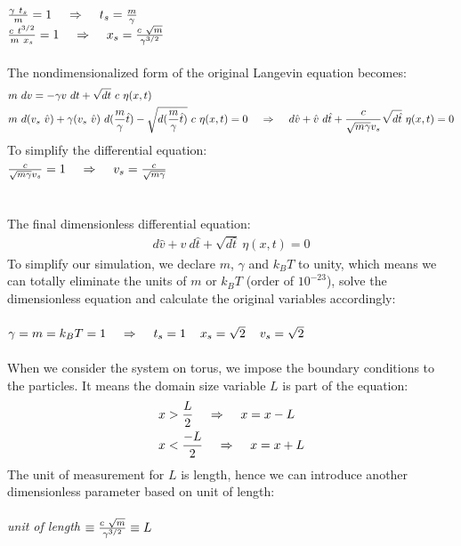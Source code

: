 \documentclass[a4paper,11pt]{article}
\newcommand\tab[1][4mm]{\hspace*{#1}}
\begin{document}
    \(\frac{\gamma\ t_s}{m} = 1 \tab \Rightarrow \tab t_s = \frac{m}{\gamma}\) \hspace{20mm}
    {} \\

    \(\frac{c\ t^{3/2}}{m\ x_s} = 1 \tab \Rightarrow \tab x_s=\frac{c\ \sqrt{m}}{\gamma^{3/2}}\) \hspace{12mm}
    {} \\\\
The nondimensionalized form of the original Langevin equation becomes:
\begin{align*}
    &m\ dv = -\gamma v\ dt + \sqrt{dt}\ c\ \eta(x,t) \\
    &m\ d(v_s\ \hat{v}) + \gamma (v_s\ \hat{v})\ d(\frac{m}{\gamma}\hat{t}) - \sqrt{d(\frac{m}{\gamma}\hat{t})}\ c\ \eta(x,t) = 0 \tab \Rightarrow \tab d\hat{v} + \hat{v}\ d\hat{t} + \frac{c}{\sqrt{m\gamma}v_s} \sqrt{d\hat{t}}\ \eta(x,t) = 0
\end{align*}
To simplify the differential equation: \\
    \(\frac{c}{\sqrt{m\gamma}v_s} = 1 \tab \Rightarrow \tab v_s = \frac{c}{\sqrt{m\gamma}}\) \hspace{15mm}
    {} \\\\
\\The final dimensionless differential equation:
\begin{align*}
    d\hat{v} + \hat{v}\ d\hat{t} + \sqrt{d\hat{t}}\ \eta(x,t) = 0
\end{align*}
To simplify our simulation, we declare \(m\), \(\gamma\) and \(k_BT\) to unity, which means we can totally eliminate the units of \(m\) or \(k_BT\) (order of \(10^{-23}\)), solve the dimensionless equation and calculate the original variables accordingly:\\\\
\(\gamma = m = k_BT = 1 \tab \Rightarrow \tab t_s = 1 \tab x_s = \sqrt{2} \tab v_s = \sqrt{2}\)
\\\\
When we consider the system on torus, we impose the boundary conditions to the particles. It means the domain size variable \(L\) is part of the equation:
\begin{align*}
  &x > \frac{L}{2} \tab \Rightarrow \tab x = x - L \\
  &x < \frac{-L}{2} \tab \Rightarrow \tab x = x + L
\end{align*}
The unit of measurement for \(L\) is length, hence we can introduce another dimensionless parameter based on unit of length: \\\\
  \emph{unit of length} \(\equiv \frac{c\ \sqrt{m}}{\gamma^{3/2}} \equiv L \tab\tab\tab \)
  {} \\
\newpage
\end{document}
